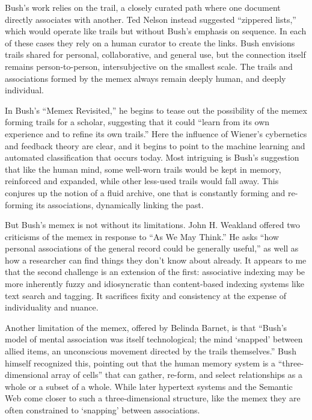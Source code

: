 Bush's work relies on the trail, a closely curated path where one document directly associates with another. Ted Nelson instead suggested ``zippered lists,'' which would operate like trails but without Bush's emphasis on sequence.\autocite[84, 89]{nelson_complex_1965} In each of these cases they rely on a human curator to create the links. Bush envisions trails shared for personal, collaborative, and general use, but the connection itself remains person-to-person, intersubjective on the smallest scale. The trails and associations formed by the memex always remain deeply human, and deeply individual.

In Bush's ``Memex Revisited,'' he begins to tease out the possibility of the memex forming trails for a scholar, suggesting that it could ``learn from its own experience and to refine its own trails.''\autocite[211]{bush_memex_1991} Here the influence of Wiener's cybernetics and feedback theory are clear, and it begins to point to the machine learning and automated classification that occurs today. Most intriguing is Bush's suggestion that like the human mind, some well-worn trails would be kept in memory, reinforced and expanded, while other less-used trails would fall away. This conjures up the notion of a fluid archive, one that is constantly forming and re-forming its associations, dynamically linking the past.

But Bush's memex is not without its limitations. John H. Weakland offered two criticisms of the memex in response to ``As We May Think.'' He asks ``how personal associations of the general record could be generally useful,'' as well as how a researcher can find things they don't know about already.\autocite[217]{nyce_innovation_1989} It appears to me that the second challenge is an extension of the first: associative indexing may be more inherently fuzzy and idiosyncratic than content-based indexing systems like text search and tagging. It sacrifices fixity and consistency at the expense of individuality and nuance.

Another limitation of the memex, offered by Belinda Barnet, is that ``Bush's model of mental association was itself technological; the mind `snapped' between allied items, an unconscious movement directed by the trails themselves.''\autocite{barnet_technical_2008} Bush himself recognized this, pointing out that the human memory system is a ``three-dimensional array of cells'' that can gather, re-form, and select relationships as a whole or a subset of a whole.\autocite[209]{bush_memex_1991} While later hypertext systems and the Semantic Web come closer to such a three-dimensional structure, like the memex they are often constrained to `snapping' between associations.

